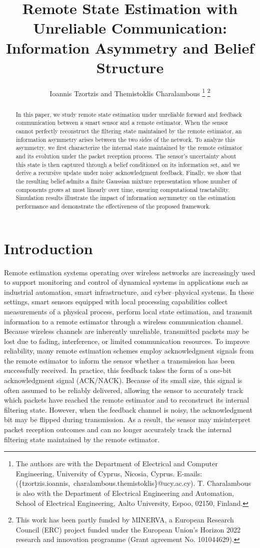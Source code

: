 \documentclass[letterpaper, 10 pt, conference]{ieeeconf}
\title{\LARGE \bf
Remote State Estimation with Unreliable Communication: \\ Information Asymmetry and Belief Structure
}
\author{Ioannis Tzortzis and Themistoklis Charalambous
\thanks{The authors are with the Department
of Electrical and Computer Engineering, University of Cyprus, Nicosia, Cyprus. E-mails: (\{tzortzis.ioannis,\ charalambous.themistoklis\}@ucy.ac.cy).  T. Charalambous is also with the Department of Electrical Engineering and Automation, School of Electrical Engineering, Aalto University, Espoo, 02150, Finland. }
 \thanks{This work has been partly funded by MINERVA, a European Research Council (ERC) project funded under the European Union's Horizon 2022 research and innovation programme (Grant agreement No. 101044629).}
}
\begin{document}
\maketitle

\begin{abstract}
In this paper, we study remote state estimation under unreliable forward and feedback communication between a smart sensor and a remote estimator. When the sensor cannot perfectly reconstruct the filtering state maintained by the remote estimator, an information asymmetry arises between the two sides of the network. To analyze this asymmetry, we first characterize the internal state maintained by the remote estimator and its evolution under the packet reception process. The sensor’s uncertainty about this state is then captured through a belief conditioned on its information set, and we derive a recursive update  under noisy acknowledgment feedback. Finally, we show that the resulting belief admits a finite Gaussian mixture representation whose number of components grows at most linearly over time, ensuring computational tractability. Simulation results illustrate the impact of information asymmetry on the estimation performance and demonstrate the effectiveness of the proposed framework.
\end{abstract}


\section{Introduction}
\label{sec:introduction}
Remote estimation systems operating over wireless networks are increasingly used to support monitoring and control of dynamical systems in applications such as industrial automation, smart infrastructure, and cyber–physical systems. In these settings, smart sensors equipped with local processing capabilities collect measurements  of a physical process, perform local state estimation, and transmit information to a remote estimator  through a wireless communication channel. Because wireless channels are inherently unreliable, transmitted packets may be lost due to fading, interference, or limited communication resources.   To improve reliability, many remote estimation schemes employ acknowledgment signals from the remote estimator to inform the sensor whether a transmission has been successfully received. In practice, this feedback takes the form of a one-bit acknowledgment signal (ACK/NACK). Because of its small size, this signal is often assumed to be reliably delivered, allowing the sensor to accurately track which packets have reached the remote estimator and to reconstruct its internal filtering state. However, when the feedback channel is noisy, the acknowledgment bit may be flipped during transmission. As a result, the sensor may misinterpret packet reception outcomes and can no longer accurately track the internal filtering state maintained by the remote estimator.
\end{document}
